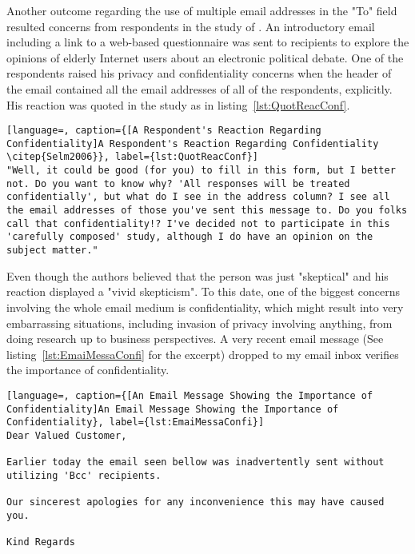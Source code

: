 Another outcome regarding the use of multiple email addresses in the "To" field resulted concerns from respondents in the study of \cite{Selm2006}. An introductory email including a link to a web-based questionnaire was sent to recipients to explore the opinions of elderly Internet users about an electronic political debate. One of the respondents raised his privacy and confidentiality concerns when the header of the email contained all the email addresses of all of the respondents, explicitly. His reaction was quoted in the study as in listing~\ref{lst:QuotReacConf}.
\vspace{1cm}

\clearpage


\begin{lstlisting}[language=, caption={[A Respondent's Reaction Regarding Confidentiality]A Respondent's Reaction Regarding Confidentiality \citep{Selm2006}}, label={lst:QuotReacConf}]
"Well, it could be good (for you) to fill in this form, but I better not. Do you want to know why? 'All responses will be treated confidentially', but what do I see in the address column? I see all the email addresses of those you've sent this message to. Do you folks call that confidentiality!? I've decided not to participate in this 'carefully composed' study, although I do have an opinion on the subject matter."
\end{lstlisting}

Even though the authors believed that the person was just "skeptical" and his reaction displayed a "vivid skepticism". To this date, one of the biggest concerns involving the whole email medium is confidentiality, which might result into very embarrassing situations, including invasion of privacy involving anything, from doing research up to business perspectives. A very recent email message (See listing~\ref{lst:EmaiMessaConfi} for the excerpt) dropped to my email inbox verifies the importance of confidentiality.
\vspace{1cm}

\begin{lstlisting}[language=, caption={[An Email Message Showing the Importance of Confidentiality]An Email Message Showing the Importance of Confidentiality}, label={lst:EmaiMessaConfi}]
Dear Valued Customer,

Earlier today the email seen bellow was inadvertently sent without utilizing 'Bcc' recipients.

Our sincerest apologies for any inconvenience this may have caused you.

Kind Regards
\end{lstlisting}

